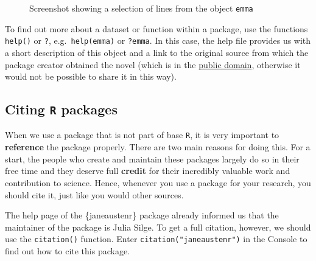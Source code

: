 \documentclass[
  letterpaper,
  DIV=11,
  numbers=noendperiod]{scrreprt}
\begin{document}
\begin{figure}


\caption{\label{fig-emma2025}Screenshot showing a selection of lines
from the object \texttt{emma}}

\end{figure}%

To find out more about a dataset or function within a package, use the
functions \texttt{help()} or \texttt{?}, e.g.~\texttt{help(emma)} or
\texttt{?emma}. In this case, the help file provides us with a short
description of this object and a link to the original source from which
the package creator obtained the novel (which is in the
\href{https://www.gutenberg.org/help/faq.html\#what-books-does-project-gutenberg-publish}{public
domain}, otherwise it would not be possible to share it in this way).

\subsection{\texorpdfstring{Citing \texttt{R}
packages}{Citing R packages}}\label{sec-CitingPackages}

When we use a package that is not part of base \texttt{R}, it is very
important to \textbf{reference} the package properly. There are two main
reasons for doing this. For a start, the people who create and maintain
these packages largely do so in their free time and they deserve full
\textbf{credit} for their incredibly valuable work and contribution to
science. Hence, whenever you use a package for your research, you should
cite it, just like you would other sources.

The help page of the \{janeaustenr\} package already informed us that
the maintainer of the package is Julia Silge. To get a full citation,
however, we should use the \texttt{citation()} function. Enter
\texttt{citation("janeaustenr")} in the Console to find out how to cite
this package.
\end{document}
